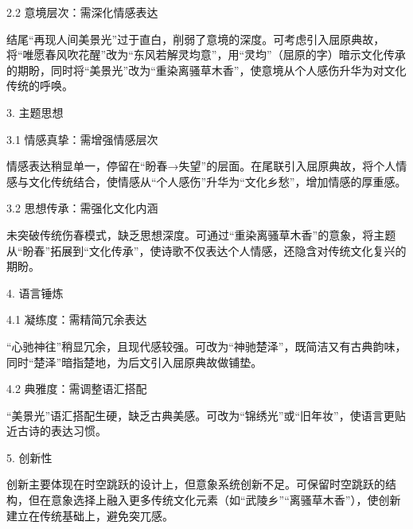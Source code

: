 \begin{tcolorbox}[
  breakable,            %
  colback=white, %
  colframe=black, 
  boxrule=1pt,        %
  arc=0mm             %
  ]
  \hspace{2em}2.2 意境层次：需深化情感表达\par
  \hspace{2em}结尾“再现人间美景光”过于直白，削弱了意境的深度。可考虑引入屈原典故，将“唯愿春风吹花醒”改为“东风若解灵均意”，用“灵均”（屈原的字）暗示文化传承的期盼，同时将“美景光”改为“重染离骚草木香”，使意境从个人感伤升华为对文化传统的呼唤。\par
  3. 主题思想\par
  \hspace{2em}3.1 情感真挚：需增强情感层次\par
      情感表达稍显单一，停留在“盼春→失望”的层面。在尾联引入屈原典故，将个人情感与文化传统结合，使情感从“个人感伤”升华为“文化乡愁”，增加情感的厚重感。\par
      \hspace{2em}3.2 思想传承：需强化文化内涵\par
      \hspace{2em}未突破传统伤春模式，缺乏思想深度。可通过“重染离骚草木香”的意象，将主题从“盼春”拓展到“文化传承”，使诗歌不仅表达个人情感，还隐含对传统文化复兴的期盼。\par
  4. 语言锤炼\par
  \hspace{2em}4.1 凝练度：需精简冗余表达\par
  \hspace{2em}“心驰神往”稍显冗余，且现代感较强。可改为“神驰楚泽”，既简洁又有古典韵味，同时“楚泽”暗指楚地，为后文引入屈原典故做铺垫。\par
  \hspace{2em}4.2 典雅度：需调整语汇搭配\par
  \hspace{2em}“美景光”语汇搭配生硬，缺乏古典美感。可改为“锦绣光”或“旧年妆”，使语言更贴近古诗的表达习惯。\par
  5. 创新性\par
  \hspace{2em}创新主要体现在时空跳跃的设计上，但意象系统创新不足。可保留时空跳跃的结构，但在意象选择上融入更多传统文化元素（如“武陵乡”“离骚草木香”），使创新建立在传统基础上，避免突兀感。\par
\end{tcolorbox}

